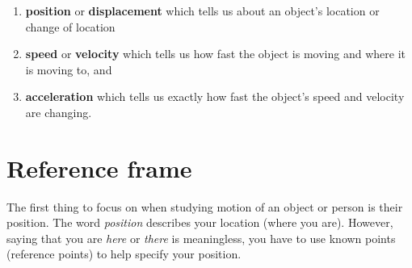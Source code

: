        \label{m38787*id62541}\begin{enumerate}[noitemsep, label=\textbf{\arabic*}. ] 
            \label{m38787*uid1}\item \textbf{position} or \textbf{displacement} which tells us about an object's location or change of location
\label{m38787*uid2}\item \textbf{speed} or \textbf{velocity} which tells us how fast the object is moving and where it is moving to, and
\label{m38787*uid3}\item \textbf{acceleration} which tells us exactly how fast the object's speed and velocity are changing.
\end{enumerate}


            \section{Reference frame}
            The first thing to focus on when studying motion of an object or person is their position. The word \textsl{position} describes your location (where you are). However, saying that you are \textsl{here} or \textsl{there} is meaningless, you have to use known points (reference points) to help specify your position.

